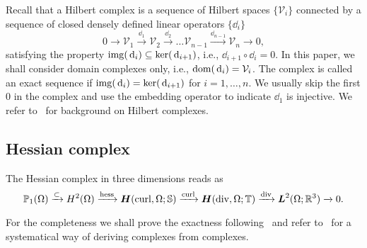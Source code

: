 Recall that a Hilbert complex is a sequence of Hilbert spaces $\{\mathcal V_i \}$ connected by a sequence of closed densely defined linear operators $\{\dd_i\}$ 
$$
0 \stackrel{}{\longrightarrow} \mathcal V_1 \stackrel{\dd_1}{\longrightarrow} \mathcal V_2 \stackrel{\dd_2}{\longrightarrow} \ldots \mathcal V_{n-1}\stackrel{\dd_{n-1}}{\longrightarrow} \mathcal V_n \longrightarrow 0,
$$
satisfying the property $\operatorname*{img} (\,{\rm d}_i)\subseteq \ker(\,{\rm d}_{i+1})$, i.e., $\dd_{i+1}\circ \dd_i = 0$. In this paper, we shall consider domain complexes only, i.e., ${\rm dom}(\,{\rm d}_i) = \mathcal V_i$. The complex is called an exact sequence if $\operatorname*{img} (\,{\rm d}_i)=  \ker(\,{\rm d}_{i+1})$ for $i=1, \ldots, n$. We usually skip the first $0$ in the complex and use the embedding operator to indicate $\dd_1$ is injective. We refer to~\cite{Arnold:2018Finite} for background on Hilbert complexes. 


\subsection{Hessian complex}

The Hessian complex in three dimensions reads as~\cite{ArnoldHu2020,PaulyZulehner2020}
\begin{equation}\label{eq:hesscomplex}
\mathbb P_1(\Omega)\xrightarrow{\subset} H^{2}(\Omega)\xrightarrow{\operatorname{hess}}\boldsymbol H(\operatorname{curl}, \Omega;\mathbb S)\xrightarrow{\operatorname{curl}} \boldsymbol H(\operatorname{div}, \Omega;\mathbb T) \xrightarrow{\operatorname{div}} \boldsymbol L^2(\Omega;\mathbb R^3)\xrightarrow{}0.
\end{equation}

For the completeness we shall prove the exactness following~\cite{PaulyZulehner2020} and refer to~\cite{ArnoldHu2020} for a systematical way of deriving complexes from complexes.  

